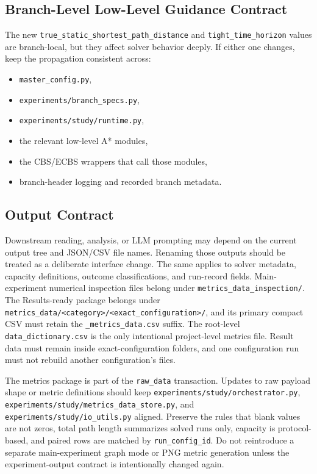 \documentclass[11pt]{article}
\begin{document}
\subsection{Branch-Level Low-Level Guidance Contract}
The new \texttt{true\_static\_shortest\_path\_distance} and \texttt{tight\_time\_horizon} values are branch-local, but they affect solver behavior deeply. If either one changes, keep the propagation consistent across:
\begin{itemize}[leftmargin=2em]
    \item \texttt{master\_config.py},
    \item \texttt{experiments/branch\_specs.py},
    \item \texttt{experiments/study/runtime.py},
    \item the relevant low-level A* modules,
    \item the CBS/ECBS wrappers that call those modules,
    \item branch-header logging and recorded branch metadata.
\end{itemize}

\subsection{Output Contract}
Downstream reading, analysis, or LLM prompting may depend on the current output tree and JSON/CSV file names. Renaming those outputs should be treated as a deliberate interface change. The same applies to solver metadata, capacity definitions, outcome classifications, and run-record fields. Main-experiment numerical inspection files belong under \texttt{metrics\_data\_inspection/}. The Results-ready package belongs under \texttt{metrics\_data/<category>/<exact\_configuration>/}, and its primary compact CSV must retain the \texttt{\_metrics\_data.csv} suffix. The root-level \texttt{data\_dictionary.csv} is the only intentional project-level metrics file. Result data must remain inside exact-configuration folders, and one configuration run must not rebuild another configuration's files.

The metrics package is part of the \texttt{raw\_data} transaction. Updates to raw payload shape or metric definitions should keep \texttt{experiments/study/orchestrator.py}, \texttt{experiments/study/metrics\_data\_store.py}, and \texttt{experiments/study/io\_utils.py} aligned. Preserve the rules that blank values are not zeros, total path length summarizes solved runs only, capacity is protocol-based, and paired rows are matched by \texttt{run\_config\_id}. Do not reintroduce a separate main-experiment graph mode or PNG metric generation unless the experiment-output contract is intentionally changed again.
\end{document}
